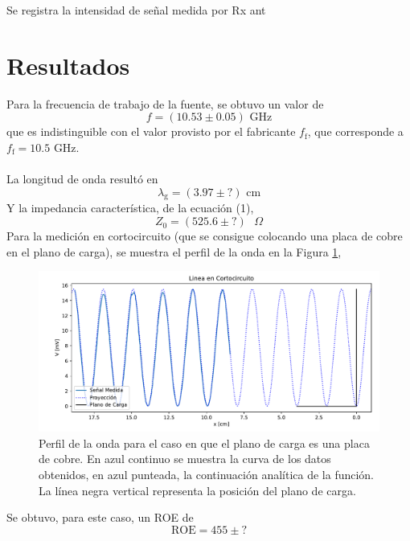 \documentclass[11pt,a4paper]{article}
\begin{document}
\begin{multicols}{2}
Se registra la intensidad de señal medida por Rx ant

\section{Resultados}
Para la frecuencia de trabajo de la fuente, se obtuvo un valor de 
$$
f = (10.53 \pm 0.05) \text{ GHz}
$$
que es indistinguible con el valor provisto por el fabricante $f_\text{f}$, que corresponde a $f_\text{f}=10.5$ GHz. \\ \\
La longitud de onda resultó en
$$
\lambda_\text{g} = (3.97 \pm ?) \text{ cm} 
$$
Y la impedancia característica, de la ecuación (1),
$$
Z_0 = (525.6 \pm ?) \text{ } \Omega
$$
Para la medición en cortocircuito (que se consigue colocando una placa de cobre en el plano de carga), se muestra el perfil de la onda en la Figura \ref{fig:cortocir}, 
\begin{figure}[H]
    \centering
    \includegraphics[width=\linewidth]{Images/lineacc.pdf}
    \caption{Perfil de la onda para el caso en que el plano de carga es una placa de cobre. En azul continuo se muestra la curva de los datos obtenidos, en azul punteada, la continuación analítica de la función. La línea negra vertical representa la posición del plano de carga.}
    \label{fig:cortocir}
\end{figure}
Se obtuvo, para este caso, un ROE de
$$
\text{ROE} = 455\pm?
$$


\end{multicols}
\end{document}
